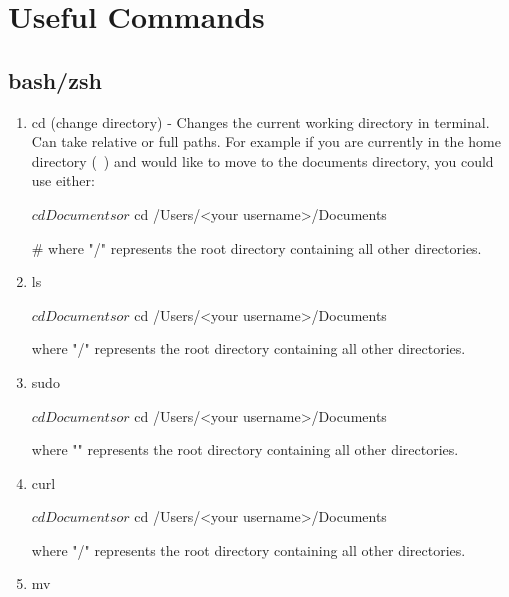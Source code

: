 \documentclass{article}
\begin{document}
\section{Useful Commands}
\subsection{bash/zsh}
\begin{enumerate}
	\item cd (change directory) - Changes the current working directory in terminal. Can take relative or full paths. For example if you are currently in the home directory (~) and would like to move to the documents directory, you could use either:
	\begin{script}
		
		$ cd Documents
		or
		$ cd /Users/<your username>/Documents
	
		# where "/" represents the root directory containing all other directories.

	\end{script}
	\item ls 
	\begin{script}
		
			$ cd Documents
			or
			$ cd /Users/<your username>/Documents
	
			where "/" represents the root directory containing all other directories.
		
	\end{script}
	\item sudo
	\begin{script}
		
			$ cd Documents
			or
			$ cd /Users/<your username>/Documents
	
			where "\/" represents the root directory containing all other directories.
		
	\end{script}
	\item curl
	\begin{script}
		
			$ cd Documents
			or
			$ cd /Users/<your username>/Documents
	
			where "/" represents the root directory containing all other directories.
		
	\end{script}
	\item mv 
	\begin{script}
		

\end{script}
\end{enumerate}
\end{document}
